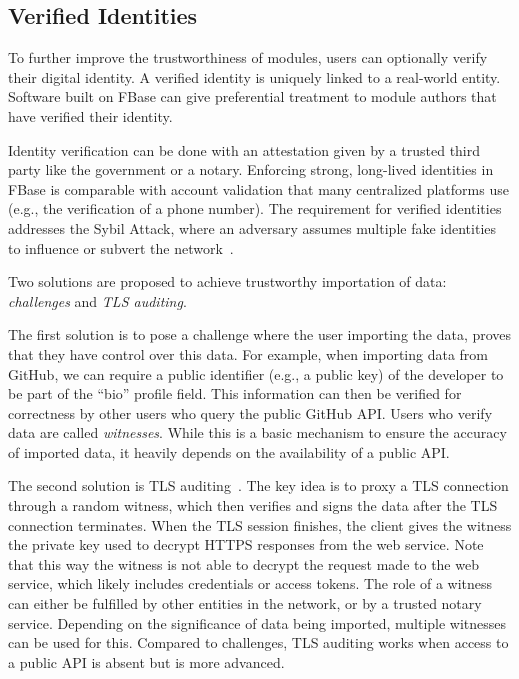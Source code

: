 \subsection{Verified Identities}
\label{subsec:strong_identities}
To further improve the trustworthiness of modules, users can optionally verify their digital identity.
A verified identity is uniquely linked to a real-world entity.
Software built on FBase can give preferential treatment to module authors that have verified their identity.

Identity verification can be done with an attestation given by a trusted third party like the government or a notary.
Enforcing strong, long-lived identities in FBase is comparable with account validation that many centralized platforms use (e.g., the verification of a phone number).
The requirement for verified identities addresses the Sybil Attack, where an adversary assumes multiple fake identities to influence or subvert the network~\cite{douceur2002sybil}.

Two solutions are proposed to achieve trustworthy importation of data: \textit{challenges} and \textit{TLS auditing}.

The first solution is to pose a challenge where the user importing the data, proves that they have control over this data.
For example, when importing data from GitHub, we can require a public identifier (e.g., a public key) of the developer to be part of the \enquote{bio} profile field.
This information can then be verified for correctness by other users who query the public GitHub API.
Users who verify data are called \emph{witnesses}.
While this is a basic mechanism to ensure the accuracy of imported data, it heavily depends on the availability of a public API.

The second solution is TLS auditing~\cite{tlsnotary2014whitepaper}.
The key idea is to proxy a TLS connection through a random witness, which then verifies and signs the data after the TLS connection terminates.
When the TLS session finishes, the client gives the witness the private key used to decrypt HTTPS responses from the web service.
Note that this way the witness is not able to decrypt the request made to the web service, which likely includes credentials or access tokens.
The role of a witness can either be fulfilled by other entities in the network, or by a trusted notary service.
Depending on the significance of data being imported, multiple witnesses can be used for this.
Compared to challenges, TLS auditing works when access to a public API is absent but is more advanced.

